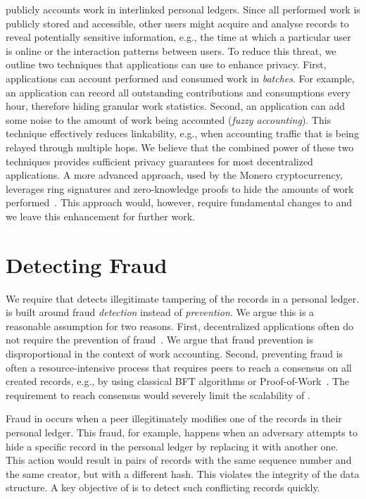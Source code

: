 \ModelName{} publicly accounts work in interlinked personal ledgers.
Since all performed work is publicly stored and accessible, other users might acquire and analyse \ModelName{} records to reveal potentially sensitive information, e.g., the time at which a particular user is online or the interaction patterns between users.
To reduce this threat, we outline two techniques that applications can use to enhance privacy.
First, applications can account performed and consumed work in \emph{batches}.
For example, an application can record all outstanding contributions and consumptions every hour, therefore hiding granular work statistics.
Second, an application can add some noise to the amount of work being accounted (\emph{fuzzy accounting}).
This technique effectively reduces linkability, e.g., when accounting traffic that is being relayed through multiple hops.
We believe that the combined power of these two techniques provides sufficient privacy guarantees for most decentralized applications.
A more advanced approach, used by the Monero cryptocurrency, leverages ring signatures and zero-knowledge proofs to hide the amounts of work performed~\cite{bunz2018bulletproofs,poelstra2018confidential}.
This approach would, however, require fundamental changes to \ModelName{} and we leave this enhancement for further work.

\section{Detecting Fraud}
\label{sec:detecting_fraud}
We require that \ModelName{} detects illegitimate tampering of the records in a personal ledger.
\ModelName{} is built around fraud \emph{detection} instead of \emph{prevention}.
We argue this is a reasonable assumption for two reasons.
First, decentralized applications often do not require the prevention of fraud~\cite{krishnan2002virtual}.
We argue that fraud prevention is disproportional in the context of work accounting.
Second, preventing fraud is often a resource-intensive process that requires peers to reach a consensus on all created records, e.g., by using classical BFT algorithms or Proof-of-Work~\cite{vukolic2015quest}.
The requirement to reach consensus would severely limit the scalability of \ModelName{}.

Fraud in \ModelName{} occurs when a peer illegitimately modifies one of the records in their personal ledger.
This fraud, for example, happens when an adversary attempts to hide a specific record in the personal ledger by replacing it with another one.
This action would result in pairs of records with the same sequence number and the same creator, but with a different hash.
This violates the integrity of the \ModelName{} data structure.
A key objective of \ModelName{} is to detect such conflicting records quickly.

